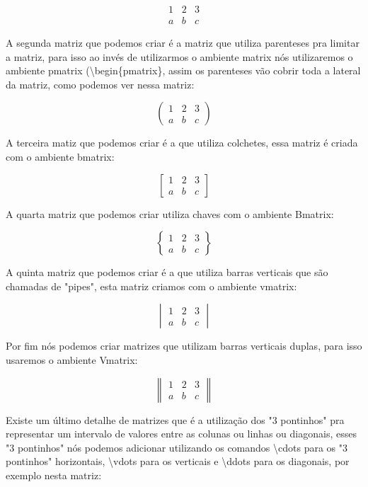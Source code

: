 \[\begin{matrix}
    1 & 2 & 3\\
    a & b & c
\end{matrix}\]

A segunda matriz que podemos criar é a matriz que utiliza parenteses pra limitar a matriz, para isso ao invés de utilizarmos o ambiente matrix nós utilizaremos o ambiente pmatrix (\textbackslash begin\{pmatrix\}, assim os parenteses vão cobrir toda a lateral da matriz, como podemos ver nessa matriz:

\[\begin{pmatrix}
    1 & 2 & 3\\
    a & b & c
\end{pmatrix}\]

A terceira matiz que podemos criar é a que utiliza colchetes, essa matriz é criada com o ambiente bmatrix:

\[\begin{bmatrix}
    1 & 2 & 3\\
    a & b & c
\end{bmatrix}\]

A quarta matriz que podemos criar utiliza chaves com o ambiente Bmatrix:

\[\begin{Bmatrix}
    1 & 2 & 3\\
    a & b & c
\end{Bmatrix}\]

A quinta matriz que podemos criar é a que utiliza barras verticais que são chamadas de "pipes", esta matriz criamos com o ambiente vmatrix:

\[\begin{vmatrix}
    1 & 2 & 3\\
    a & b & c
\end{vmatrix}\]

Por fim nós podemos criar matrizes que utilizam barras verticais duplas, para isso usaremos o ambiente Vmatrix:

\[\begin{Vmatrix}
    1 & 2 & 3\\
    a & b & c
\end{Vmatrix}\]

Existe um último detalhe de matrizes que é a utilização dos "3 pontinhos" pra representar um intervalo de valores entre as colunas ou linhas ou diagonais, esses "3 pontinhos" nós podemos adicionar utilizando os comandos \textbackslash cdots para os "3 pontinhos" horizontais, \textbackslash vdots para os verticais e \textbackslash ddots para os diagonais, por exemplo nesta matriz:

